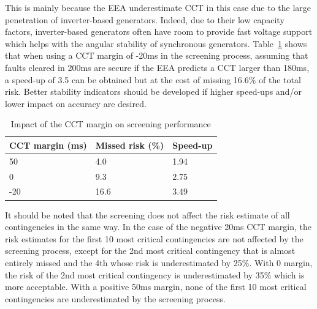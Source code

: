 This is mainly because the EEA underestimate CCT in this case due to the large penetration of inverter-based generators. Indeed, due to their low capacity factors, inverter-based generators often have room to provide fast voltage support which helps with the angular stability of synchronous generators. Table~\ref{tab:CCT_margin} shows that when using a CCT margin of -20ms in the screening process, \ie assuming that faults cleared in 200ms are secure if the EEA predicts a CCT larger than 180ms, a speed-up of 3.5 can be obtained but at the cost of missing 16.6\% of the total risk. Better stability indicators should be developed if higher speed-ups and/or lower impact on accuracy are desired.

\begin{table}
  \centering
  \caption{Impact of the CCT margin on screening performance}
  \label{tab:CCT_margin}
  \begin{tabular}{@{}lll@{}}
  \toprule
  CCT margin (ms) & Missed risk (\%) & Speed-up \\ \midrule
  50  & 4.0  & 1.94 \\
  0   & 9.3  & 2.75 \\
  -20 & 16.6 & 3.49 \\ \bottomrule
  \end{tabular}
\end{table}

It should be noted that the screening does not affect the risk estimate of all contingencies in the same way. In the case of the negative 20ms CCT margin, the risk estimates for the first 10 most critical contingencies are not affected by the screening process, except for the 2nd most critical contingency that is almost entirely missed and the 4th whose risk is underestimated by 25\%. With 0 margin, the risk of the 2nd most critical contingency is underestimated by 35\% which is more acceptable. With a positive 50ms margin, none of the first 10 most critical contingencies are underestimated by the screening process.


